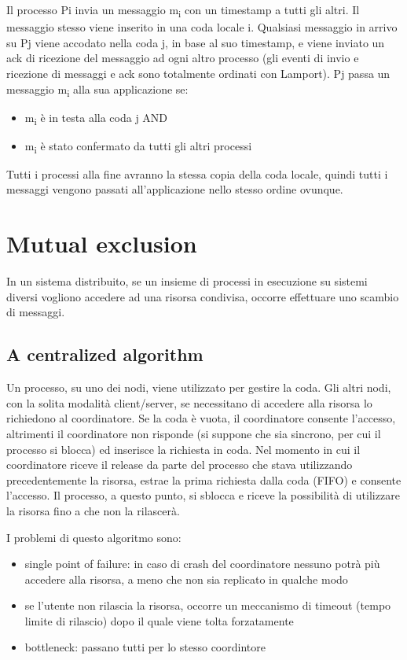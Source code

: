 Il processo Pi invia un messaggio m\textsubscript{i} con un timestamp a tutti gli altri. Il messaggio stesso viene inserito in una coda locale i. Qualsiasi messaggio in arrivo su Pj viene accodato nella coda j, in base al suo timestamp, e viene inviato un ack di ricezione del messaggio ad ogni altro processo (gli eventi di invio e ricezione di messaggi e ack sono totalmente ordinati con Lamport). Pj passa un messaggio m\textsubscript{i} alla sua applicazione se:
\begin{itemize}
    \item m\textsubscript{i} è in testa alla coda j AND
    \item m\textsubscript{i} è stato confermato da tutti gli altri processi 
\end{itemize}

Tutti i processi alla fine avranno la stessa copia della coda locale, quindi tutti i messaggi vengono passati all'applicazione nello stesso ordine ovunque.

\section{Mutual exclusion}

In un sistema distribuito, se un insieme di processi in esecuzione su sistemi diversi vogliono accedere ad una risorsa condivisa, occorre effettuare uno scambio di messaggi.

\subsection{A centralized algorithm}

Un processo, su uno dei nodi, viene utilizzato per gestire la coda. Gli altri nodi, con la solita modalità client/server, se necessitano di accedere alla risorsa lo richiedono al coordinatore. Se la coda è vuota, il coordinatore consente l'accesso, altrimenti il coordinatore non risponde (si suppone che sia sincrono, per cui il processo si blocca) ed inserisce la richiesta in coda. Nel momento in cui il coordinatore riceve il release da parte del processo che stava utilizzando precedentemente la risorsa, estrae la prima richiesta dalla coda (FIFO) e consente l'accesso. Il processo, a questo punto, si sblocca e riceve la possibilità di utilizzare la risorsa fino a che non la rilascerà. 

I problemi di questo algoritmo sono:
\begin{itemize}
    \item single point of failure: in caso di crash del coordinatore nessuno potrà più accedere alla risorsa, a meno che non sia replicato in qualche modo
    \item se l'utente non rilascia la risorsa, occorre un meccanismo di timeout (tempo limite di rilascio) dopo il quale viene tolta forzatamente
    \item bottleneck: passano tutti per lo stesso coordintore
\end{itemize}

